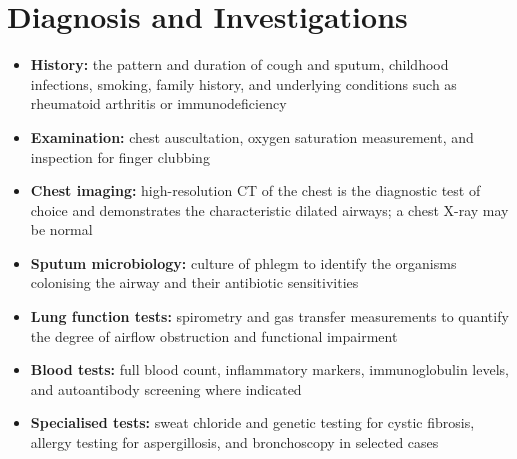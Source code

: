 \section*{Diagnosis and Investigations}
\begin{itemize}
    \item \textbf{History:} the pattern and duration of cough and sputum, childhood infections, smoking, family history, and underlying conditions such as rheumatoid arthritis or immunodeficiency
    \item \textbf{Examination:} chest auscultation, oxygen saturation measurement, and inspection for finger clubbing
    \item \textbf{Chest imaging:} high-resolution CT of the chest is the diagnostic test of choice and demonstrates the characteristic dilated airways; a chest X-ray may be normal
    \item \textbf{Sputum microbiology:} culture of phlegm to identify the organisms colonising the airway and their antibiotic sensitivities
    \item \textbf{Lung function tests:} spirometry and gas transfer measurements to quantify the degree of airflow obstruction and functional impairment
    \item \textbf{Blood tests:} full blood count, inflammatory markers, immunoglobulin levels, and autoantibody screening where indicated
    \item \textbf{Specialised tests:} sweat chloride and genetic testing for cystic fibrosis, allergy testing for aspergillosis, and bronchoscopy in selected cases
\end{itemize}

